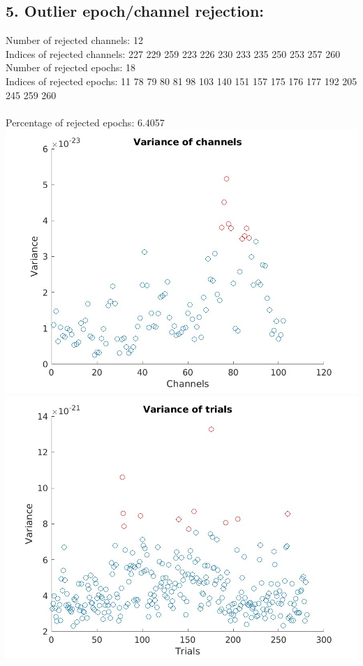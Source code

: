 \documentclass[10pt,a4paper,oneside]{report}
\begin{document}
\subsection*{5. Outlier epoch/channel rejection:}
Number of rejected channels: 12 
\\ Indices of rejected channels: 227  229  259  223  226  230  233  235  250  253  257  260 
\\ Number of rejected epochs: 18 
\\ Indices of rejected epochs: 11   78   79   80   81   98  103  140  151  157  175  176  177  192  205  245  259  260\\ 
\\ Percentage of rejected epochs: 6.4057\\ 
\includegraphics[width=14cm]{bad_channels.jpg}\\
\includegraphics[width=14cm]{bad_trials.jpg}\\
\end{document}
